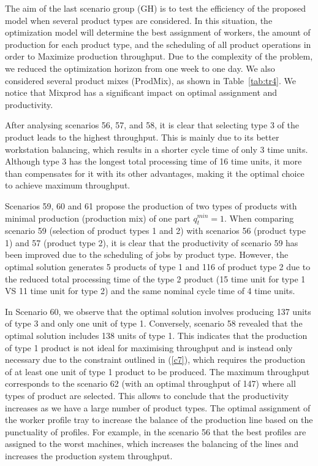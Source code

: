 \documentclass[review,12pt, 3p, times]{elsarticle}
\begin{document}
					

				
The aim of the last scenario group (GH) is to test the efficiency of the proposed model when several product types are considered. In this situation, the optimization model will determine the best assignment of workers,  the amount of production for each product type, and the scheduling of all product operations in order to Maximize production throughput. Due to the complexity of the problem, we reduced the optimization horizon from one week to one day. We also considered several product mixes (ProdMix), as shown in Table~\ref{tab:tr4}. We notice that Mixprod has a significant impact on optimal assignment and productivity. 
			
After analysing scenarios 56, 57, and 58, it is clear that selecting type 3 of the product leads to the highest throughput. This is mainly due to its better workstation balancing, which results in a shorter cycle time of only 3 time units. Although type 3 has the longest total processing time of 16 time units, it more than compensates for it with its other advantages, making it the optimal choice to achieve maximum throughput.  
		
Scenarios 59, 60 and 61 propose the production of two types of products with minimal production (production mix) of one part $q_t^{min}= 1$. When comparing scenario 59 (selection of product types 1 and 2) with scenarios 56 (product type 1) and 57 (product type 2), it is clear that the productivity of scenario 59 has been improved due to the scheduling of jobs by product type. However, the optimal solution generates 5 products of type 1 and 116 of product type 2 due to the reduced total processing time of the type 2 product (15 time unit for type 1 VS 11 time unit for type 2) and the same nominal cycle time of 4 time units. 
			
			
In Scenario 60, we observe that the optimal solution involves producing 137 units of type 3 and only one unit of type 1. Conversely, scenario 58 revealed that the optimal solution includes 138 units of type 1. This indicates that the production of type 1 product is not ideal for maximising throughput and is instead only necessary due to the constraint outlined in (\ref{c7}), which requires the production of at least one unit of type 1 product to be produced.
The maximum throughput corresponds to the scenario 62 (with an optimal throughput of 147) where all types of product are selected. This allows to conclude that the productivity increases as we have a large number of product types. 
The optimal assignment of the worker profile tray to increase the balance of the production line based on the punctuality of profiles. For example, in the scenario 56 that the best profiles are assigned to the worst machines, which increases the balancing of the lines and increases the production system throughput. 
	
\end{document}
